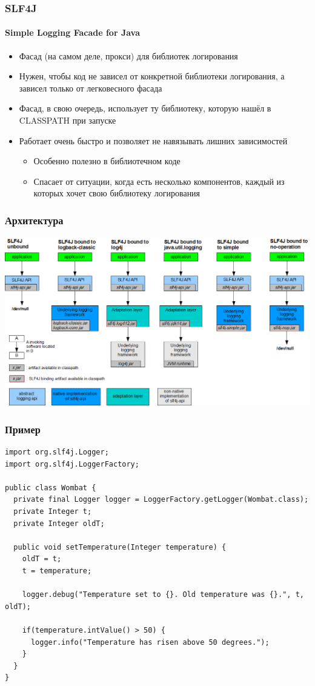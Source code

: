 \documentclass[xetex,mathserif,serif]{beamer}
\begin{document}
	\begin{frame}
		\frametitle{SLF4J}
		\framesubtitle{Simple Logging Facade for Java}
		\begin{itemize}
			\item Фасад (на самом деле, прокси) для библиотек логирования
			\item Нужен, чтобы код не зависел от конкретной библиотеки логирования, а зависел только от легковесного фасада
			\item Фасад, в свою очередь, использует ту библиотеку, которую нашёл в CLASSPATH при запуске
			\item Работает очень быстро и позволяет не навязывать лишних зависимостей
			\begin{itemize}
				\item Особенно полезно в библиотечном коде
				\item Спасает от ситуации, когда есть несколько компонентов, каждый из которых хочет свою библиотеку логирования
			\end{itemize}
		\end{itemize}
	\end{frame}

	\begin{frame}
		\frametitle{Архитектура}
		\begin{center}
			\includegraphics[width=\textwidth]{slf4jBindings.png}
		\end{center}
	\end{frame}

	\begin{frame}[fragile]
		\frametitle{Пример}
		\begin{footnotesize}
			\begin{verbatim}
import org.slf4j.Logger;
import org.slf4j.LoggerFactory;

public class Wombat {
  private final Logger logger = LoggerFactory.getLogger(Wombat.class);
  private Integer t;
  private Integer oldT;

  public void setTemperature(Integer temperature) {
    oldT = t;
    t = temperature;

    logger.debug("Temperature set to {}. Old temperature was {}.", t, oldT);

    if(temperature.intValue() > 50) {
      logger.info("Temperature has risen above 50 degrees.");
    }
  }
} 
			\end{verbatim}
		\end{footnotesize}
\end{frame}
\end{document}
